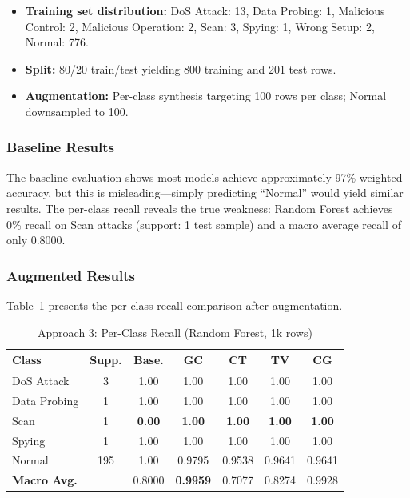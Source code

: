 \documentclass[conference]{IEEEtran}
\begin{document}
\begin{itemize}
    \item \textbf{Training set distribution:} DoS Attack: 13, Data Probing: 1, Malicious Control: 2, Malicious Operation: 2, Scan: 3, Spying: 1, Wrong Setup: 2, Normal: 776.
    \item \textbf{Split:} 80/20 train/test yielding 800 training and 201 test rows.
    \item \textbf{Augmentation:} Per-class synthesis targeting 100 rows per class; Normal downsampled to 100.
\end{itemize}

\subsubsection{Baseline Results}
The baseline evaluation shows most models achieve approximately 97\% weighted accuracy, but this is misleading---simply predicting ``Normal'' would yield similar results. The per-class recall reveals the true weakness: Random Forest achieves 0\% recall on Scan attacks (support: 1 test sample) and a macro average recall of only 0.8000.

\subsubsection{Augmented Results}
Table~\ref{tab:approach3} presents the per-class recall comparison after augmentation.

\begin{table}[htbp]
\caption{Approach 3: Per-Class Recall (Random Forest, 1k rows)}
\label{tab:approach3}
\centering
\begin{tabular}{l c c c c c c}
\toprule
\textbf{Class} & \textbf{Supp.} & \textbf{Base.} & \textbf{GC} & \textbf{CT} & \textbf{TV} & \textbf{CG} \\
\midrule
DoS Attack     & 3   & 1.00 & 1.00 & 1.00 & 1.00 & 1.00 \\
Data Probing   & 1   & 1.00 & 1.00 & 1.00 & 1.00 & 1.00 \\
Scan           & 1   & \textbf{0.00} & \textbf{1.00} & \textbf{1.00} & \textbf{1.00} & \textbf{1.00} \\
Spying         & 1   & 1.00 & 1.00 & 1.00 & 1.00 & 1.00 \\
Normal         & 195 & 1.00 & 0.9795 & 0.9538 & 0.9641 & 0.9641 \\
\midrule
\textbf{Macro Avg.} & & 0.8000 & \textbf{0.9959} & 0.7077 & 0.8274 & 0.9928 \\
\bottomrule
\end{tabular}
\end{table}
\end{document}
